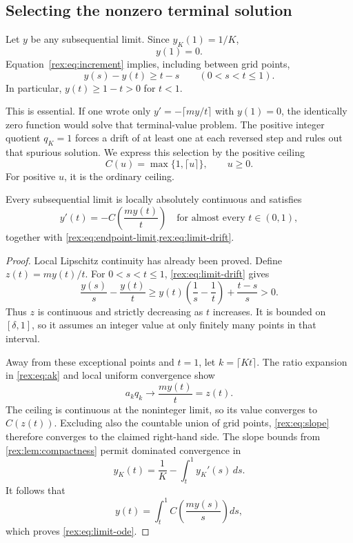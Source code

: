 \subsection{Selecting the nonzero terminal solution}

Let $y$ be any subsequential limit. Since $y_K(1)=1/K$,
\begin{equation}\label{rex:eq:endpoint-limit}
 y(1)=0.
\end{equation}
Equation~\eqref{rex:eq:increment} implies, including between grid points,
\begin{equation}\label{rex:eq:limit-drift}
 y(s)-y(t)\geq t-s\qquad(0<s<t\leq1).
\end{equation}
In particular, $y(t)\geq1-t>0$ for $t<1$.

This is essential. If one wrote only
$y'=-\lceil my/t\rceil$ with $y(1)=0$, the identically zero function
would solve that terminal-value problem. The positive integer quotient
$q_K=1$ forces a drift of at least one at each reversed step and rules
out that spurious solution. We express this selection by the positive
ceiling
\begin{equation}\label{rex:eq:positive-ceiling}
 C(u)=\max\{1,\lceil u\rceil\},\qquad u\geq0.
\end{equation}
For positive $u$, it is the ordinary ceiling.

\begin{lemma}\label{rex:lem:ode}
Every subsequential limit is locally absolutely continuous and satisfies
\begin{equation}\label{rex:eq:limit-ode}
 y'(t)=-C\!\left(\frac{my(t)}t\right)
 \quad\text{for almost every }t\in(0,1),
\end{equation}
together with \cref{rex:eq:endpoint-limit,rex:eq:limit-drift}.
\end{lemma}

\begin{proof}
Local Lipschitz continuity has already been proved. Define
$z(t)=my(t)/t$. For $0<s<t\leq1$, \cref{rex:eq:limit-drift} gives
\[
 \frac{y(s)}s-\frac{y(t)}t
 \geq y(t)\left(\frac1s-\frac1t\right)+\frac{t-s}{s}>0.
\]
Thus $z$ is continuous and strictly decreasing as $t$ increases.
It is bounded on $[\delta,1]$, so it assumes an integer value at only
finitely many points in that interval.

Away from these exceptional points and $t=1$, let $k=\lceil Kt\rceil$.
The ratio expansion in \cref{rex:eq:ak} and local uniform convergence show
\[
 a_kq_k\longrightarrow\frac{my(t)}t=z(t).
\]
The ceiling is continuous at the noninteger limit, so its value converges
to $C(z(t))$. Excluding also the countable union of grid points, \cref{rex:eq:slope} therefore
converges to the claimed right-hand side. The slope bounds from
\cref{rex:lem:compactness} permit dominated convergence in
\[
 y_K(t)=\frac1K-\int_t^1y_K'(s)\,ds.
\]
It follows that
\[
 y(t)=\int_t^1 C\!\left(\frac{my(s)}s\right)ds,
\]
which proves \cref{rex:eq:limit-ode}.
\end{proof}

